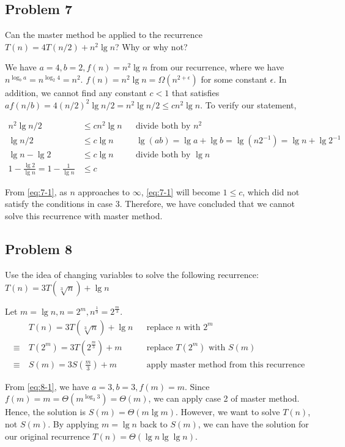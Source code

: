 \documentclass[a4paper]{article}
\makeatletter
\newenvironment{solution}
  {\begin{proof}[Solution]}
  {\end{proof}}
\renewenvironment{proof}[1][\proofname]{%
  \par\pushQED{\qed}\normalfont%
  \topsep6\p@\@plus6\p@\relax
  \trivlist\item[\hskip\labelsep\bfseries#1\@addpunct{.}]%
  \ignorespaces
}{%
  \popQED\endtrivlist\@endpefalse
}
\makeatother
\begin{document}
\subsection*{Problem 7}
Can the master method be applied to the recurrence $T(n)=4T(n/2)+n^2 \lg n$? Why or why not?
\begin{solution}
  We have $a = 4, b = 2, f(n) = n^2\lg n$ from our recurrence, where we have $n^{\log_{b}a} = n^{\log_{2}4} = n^2$. $f(n) = n^2\lg n= \Omega({n^{2 + \epsilon}})$ for some constant $\epsilon$. In addition, we cannot find any constant $c < 1$ that satisfies $af(n/b) = 4(n/2)^2\lg n/2  = n^2\lg n/2 \le cn^2 \lg n$. To verify our statement,

  \begin{align}
    n^2\lg n/2 &\le cn^2 \lg n && \text{divide both by $n^2$}\nonumber\\
    \lg n/2 &\le c\lg n && \lg(ab) = \lg a + \lg b = \lg(n2^{-1}) = \lg n + \lg2^{-1}\nonumber\\
    \lg n - \lg 2 &\le c\lg n && \text{divide both by $\lg n$}\nonumber\\
    1 - \frac{\lg 2}{\lg n} = 1 - \frac{1}{\lg n}&\le c \label{eq:7-1}
  \end{align}

  From \eqref{eq:7-1}, as $n$ approaches to $\infty$, \eqref{eq:7-1} will become $1 \le c$, which did not satisfy the conditions in case 3. Therefore, we have concluded that we cannot solve this recurrence with master method.
\end{solution}
\setcounter{equation}{0}

\subsection*{Problem 8}
Use the idea of changing variables to solve the following recurrence: $T(n)=3T(\sqrt[3]n)+\lg n$
\begin{solution}
  Let $m = \lg n, n = 2^m, n^{\frac{1}{3}} = 2^{\frac{m}{3}}$.
  \begin{align}
          & T(n) = 3T(\sqrt[3]{n}) + \lg n && \text{replace $n$ with $2^m$}\nonumber\\
    \equiv\ & T(2^m) = 3T(2^{\frac{m}{3}}) + m && \text{replace $T(2^m)$ with $S(m)$}\nonumber\\
    \equiv\ & S(m) = 3S(\frac{m}{3}) + m \label{eq:8-1} && \text{apply master method from this recurrence}
  \end{align}

  From \eqref{eq:8-1}, we have $a = 3, b = 3, f(m) = m$. Since $f(m) =m = \Theta(m^{\log_{3}{3}}) = \Theta(m)$, we can apply case 2 of master method. Hence, the solution is $S(m) = \Theta(m\lg m)$. However, we want to solve $T(n)$, not $S(m)$. By applying $m = \lg n$ back to $S(m)$, we can have the solution for our original recurrence $T(n) = \Theta(\lg n \lg \lg n)$.
\end{solution}
\end{document}

